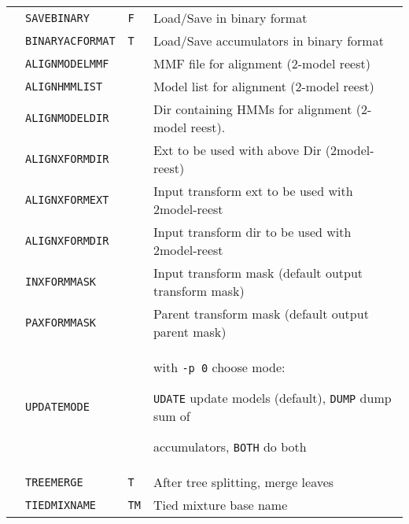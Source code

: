 \begin{center}
\begin{supertabular}{|p{1.8cm}|l|l|p{6.6cm}|}




  & \texttt{SAVEBINARY} & \texttt{F} & Load/Save in binary format \\ 


  & \texttt{BINARYACFORMAT} & \texttt{T} & Load/Save accumulators in binary format \\ 


  & \texttt{ALIGNMODELMMF} & & MMF file for alignment (2-model reest)  \\ 


  & \texttt{ALIGNHMMLIST}  & & Model list for alignment (2-model reest) \\ 


  & \texttt{ALIGNMODELDIR} & & Dir containing HMMs for alignment (2-model reest).  \\ 


  & \texttt{ALIGNXFORMDIR} & & Ext to be used with above Dir (2model-reest) \\  


  & \texttt{ALIGNXFORMEXT} & & Input transform ext to be used with 2model-reest \\  


  & \texttt{ALIGNXFORMDIR} & & Input transform dir to be used with 2model-reest \\  


  & \texttt{INXFORMMASK} & & Input transform mask (default output transform mask) \\  


  & \texttt{PAXFORMMASK} & & Parent transform mask (default output parent mask) \\  


  & \texttt{UPDATEMODE} & & with \texttt{-p 0} choose mode:


  \texttt{UDATE} update models (default), \texttt{DUMP} dump sum of


  accumulators, \texttt{BOTH} do both\\   


\hline







 & \texttt{TREEMERGE} & \texttt{T} & After tree splitting, merge leaves \\ 


  & \texttt{TIEDMIXNAME} & \texttt{TM} & Tied mixture base name \\ 



\end{supertabular}
\end{center}
